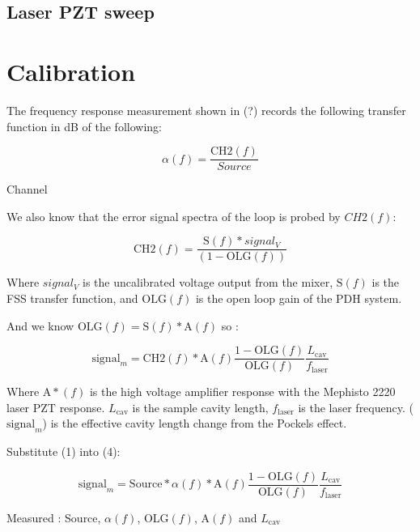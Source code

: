 \subsection{Laser PZT sweep}



\section{Calibration}
The frequency response measurement shown in (?) records the following transfer function in dB of the following:

\begin{equation}
\alpha(f) = \frac{\mathrm{CH2}(f)}{Source}
\end{equation}

Channel

We also know that the error signal spectra of the loop is probed by $CH2(f)$:


\begin{equation}
\mathrm{CH2}(f) = \frac{\mathrm{S}(f)*signal_V}{(1-\mathrm{OLG}(f))}
\end{equation}

Where $signal_V$ is the uncalibrated voltage output from the mixer, $\mathrm{S}(f)$ is the FSS transfer function, and $\mathrm{OLG}(f)$ is the open loop gain of the PDH system.

And we know $\mathrm{OLG}(f) = \mathrm{S}(f)*\mathrm{A}(f)$ so :

\begin{equation}
\mathrm{signal}_m = \mathrm{CH2}(f)*\mathrm{A}(f) \frac{1-\mathrm{OLG}(f)}{\mathrm{OLG}(f)} \frac{L_\mathrm{cav}}{f_\mathrm{laser}}
\end{equation}

Where $\mathrm{A}*(f)$ is the high voltage amplifier response with the Mephisto 2220 laser PZT response. $L_\mathrm{cav}$ is the sample cavity length, $f_\mathrm{laser}$ is the laser frequency. ($\mathrm{signal}_m$)  is the effective cavity length change from the Pockels effect.

Substitute (1) into (4):

\begin{equation}
\mathrm{signal}_m = \mathrm{Source} * \alpha(f) * \mathrm{A}(f) \frac{1-\mathrm{OLG}(f)}{\mathrm{OLG}(f)} \frac{L_\mathrm{cav}}{f_\mathrm{laser}}
\end{equation}

Measured :
Source, $\alpha (f)$, OLG$(f)$, A$(f)$ and $L_\mathrm{cav}$

